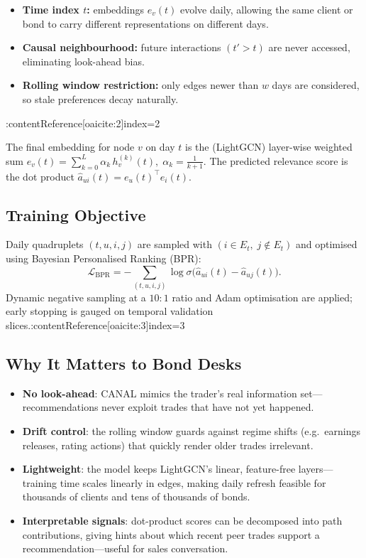 \documentclass{article}
\begin{document}
\begin{itemize}
    \item \textbf{Time index $t$:} embeddings $e_v(t)$ evolve daily, allowing the same client or bond to carry different representations on different days.
    \item \textbf{Causal neighbourhood:} future interactions $(t'>t)$ are never accessed, eliminating look-ahead bias.
    \item \textbf{Rolling window restriction:} only edges newer than $w$ days are considered, so stale preferences decay naturally.
\end{itemize}:contentReference[oaicite:2]{index=2}

The final embedding for node $v$ on day $t$ is the (LightGCN) layer-wise weighted sum
$
e_v(t)=\sum_{k=0}^{L}\alpha_k\,h^{(k)}_v(t),\;
\alpha_k=\tfrac1{k+1}.
$
The predicted relevance score is the dot product
$
\hat a_{u i}(t)=e_u(t)^\top e_i(t).
$

\subsection*{Training Objective}

Daily quadruplets $(t,u,i,j)$ are sampled with
\(
(i\! \in\!  E_t,\;j\notin E_t)
\)
and optimised using Bayesian Personalised Ranking (BPR):
\[
\mathcal L_{\mathrm{BPR}}
    =-\!\!\!\!\sum_{(t,u,i,j)}\!
      \log\sigma\!\bigl(\hat a_{u i}(t)-\hat a_{u j}(t)\bigr).
\]
Dynamic negative sampling at a $10{:}1$ ratio and Adam optimisation are applied; early stopping is gauged on temporal validation slices.:contentReference[oaicite:3]{index=3}

\subsection*{Why It Matters to Bond Desks}

\begin{itemize}
    \item \textbf{No look-ahead}: CANAL mimics the trader’s real information set—recommendations never exploit trades that have not yet happened.
    \item \textbf{Drift control}: the rolling window guards against regime shifts (e.g.\ earnings releases, rating actions) that quickly render older trades irrelevant.
    \item \textbf{Lightweight}: the model keeps LightGCN’s linear, feature-free layers—training time scales linearly in edges, making daily refresh feasible for thousands of clients and tens of thousands of bonds.
    \item \textbf{Interpretable signals}: dot-product scores can be decomposed into path contributions, giving hints about which recent peer trades support a recommendation—useful for sales conversation.
\end{itemize}
\end{document}
